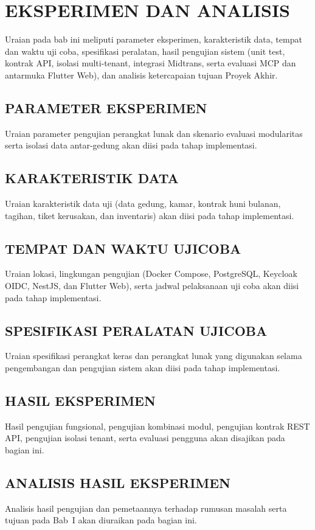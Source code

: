 \chapter{EKSPERIMEN DAN ANALISIS}

Uraian pada bab ini meliputi parameter eksperimen, karakteristik data, tempat dan waktu uji coba, spesifikasi peralatan, hasil pengujian sistem (unit test, kontrak API, isolasi multi-tenant, integrasi Midtrans, serta evaluasi MCP dan antarmuka Flutter Web), dan analisis ketercapaian tujuan Proyek Akhir.

\section{PARAMETER EKSPERIMEN}

Uraian parameter pengujian perangkat lunak dan skenario evaluasi modularitas serta isolasi data antar-gedung akan diisi pada tahap implementasi.

\section{KARAKTERISTIK DATA}

Uraian karakteristik data uji (data gedung, kamar, kontrak huni bulanan, tagihan, tiket kerusakan, dan inventaris) akan diisi pada tahap implementasi.

\section{TEMPAT DAN WAKTU UJICOBA}

Uraian lokasi, lingkungan pengujian (Docker Compose, PostgreSQL, Keycloak OIDC, NestJS, dan Flutter Web), serta jadwal pelaksanaan uji coba akan diisi pada tahap implementasi.

\section{SPESIFIKASI PERALATAN UJICOBA}

Uraian spesifikasi perangkat keras dan perangkat lunak yang digunakan selama pengembangan dan pengujian sistem akan diisi pada tahap implementasi.

\section{HASIL EKSPERIMEN}

Hasil pengujian fungsional, pengujian kombinasi modul, pengujian kontrak REST API, pengujian isolasi tenant, serta evaluasi pengguna akan disajikan pada bagian ini.

\section{ANALISIS HASIL EKSPERIMEN}

Analisis hasil pengujian dan pemetaannya terhadap rumusan masalah serta tujuan pada Bab~I akan diuraikan pada bagian ini.
